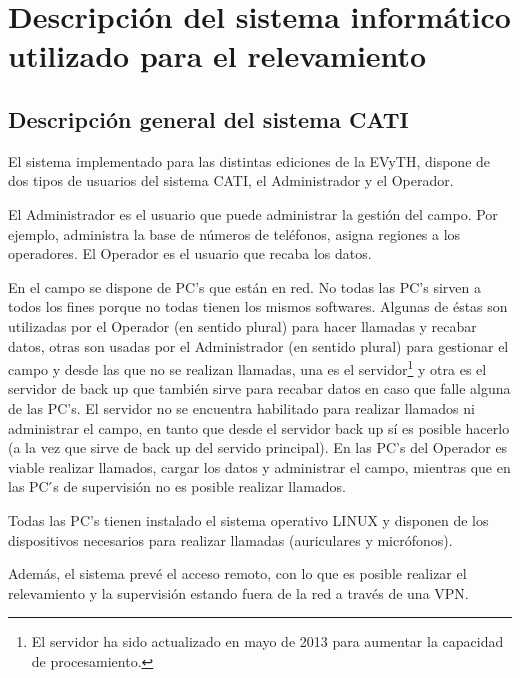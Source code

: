 \documentclass[
  openany]{book}
\begin{document}
\hypertarget{descripciuxf3n-del-sistema-informuxe1tico-utilizado-para-el-relevamiento}{%
\section{Descripción del sistema informático utilizado para el relevamiento}\label{descripciuxf3n-del-sistema-informuxe1tico-utilizado-para-el-relevamiento}}

\hypertarget{descripciuxf3n-general-del-sistema-cati}{%
\subsection{Descripción general del sistema CATI}\label{descripciuxf3n-general-del-sistema-cati}}

El sistema implementado para las distintas ediciones de la EVyTH, dispone de dos tipos de usuarios del sistema CATI, el Administrador y el Operador.

El Administrador es el usuario que puede administrar la gestión del campo. Por ejemplo, administra la base de números de teléfonos, asigna regiones a los operadores. El Operador es el usuario que recaba los datos.

En el campo se dispone de PC's que están en red. No todas las PC's sirven a todos los fines porque no todas tienen los mismos softwares. Algunas de éstas son utilizadas por el Operador (en sentido plural) para hacer llamadas y recabar datos, otras son usadas por el Administrador (en sentido plural) para gestionar el campo y desde las que no se realizan llamadas, una es el servidor\footnote{El servidor ha sido actualizado en mayo de 2013 para aumentar la capacidad de procesamiento.} y otra es el servidor de back up que también sirve para recabar datos en caso que falle alguna de las PC's. El servidor no se encuentra habilitado para realizar llamados ni administrar el campo, en tanto que desde el servidor back up sí es posible hacerlo (a la vez que sirve de back up del servido principal). En las PC's del Operador es viable realizar llamados, cargar los datos y administrar el campo, mientras que en las PC ́s de supervisión no es posible realizar llamados.

Todas las PC's tienen instalado el sistema operativo LINUX y disponen de los dispositivos necesarios para realizar llamadas (auriculares y micrófonos).

Además, el sistema prevé el acceso remoto, con lo que es posible realizar el relevamiento y la supervisión estando fuera de la red a través de una VPN.
\end{document}
